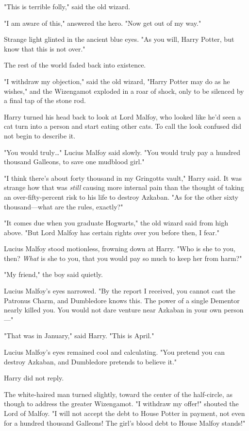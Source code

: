 "This is terrible folly," said the old wizard.

"I am aware of this," answered the hero. "Now get out of my way."

Strange light glinted in the ancient blue eyes. "As you will, Harry Potter, but
know that this is not over."

The rest of the world faded back into existence.

"I withdraw my objection," said the old wizard, "Harry Potter may do as he
wishes," and the Wizengamot exploded in a roar of shock, only to be silenced by
a final tap of the stone rod.

Harry turned his head back to look at Lord Malfoy, who looked like he'd seen a
cat turn into a person and start eating other cats. To call the look confused
did not begin to describe it.

"You would truly{\ldots}" Lucius Malfoy said slowly. "You would truly pay a
hundred thousand Galleons, to save one mudblood girl."

"I think there's about forty thousand in my Gringotts vault," Harry said. It
was strange how that was \emph{still} causing more internal pain than the
thought of taking an over-fifty-percent risk to his life to destroy Azkaban.
"As for the other sixty thousand---what are the rules, exactly?"

"It comes due when you graduate Hogwarts," the old wizard said from high above.
"But Lord Malfoy has certain rights over you before then, I fear."

Lucius Malfoy stood motionless, frowning down at Harry. "Who is she to you,
then? \emph{What} is she to you, that you would pay so much to keep her from
harm?"

"My friend," the boy said quietly.

Lucius Malfoy's eyes narrowed. "By the report I received, you cannot cast the
Patronus Charm, and Dumbledore knows this. The power of a single Dementor
nearly killed you. You would not dare venture near Azkaban in your own
person---"

"That was in January," said Harry. "This is April."

Lucius Malfoy's eyes remained cool and calculating. "You pretend you can
destroy Azkaban, and Dumbledore pretends to believe it."

Harry did not reply.

The white-haired man turned slightly, toward the center of the half-circle, as
though to address the greater Wizengamot. "I withdraw my offer!" shouted the
Lord of Malfoy. "I will not accept the debt to House Potter in payment, not
even for a hundred thousand Galleons! The girl's blood debt to House Malfoy
stands!"

